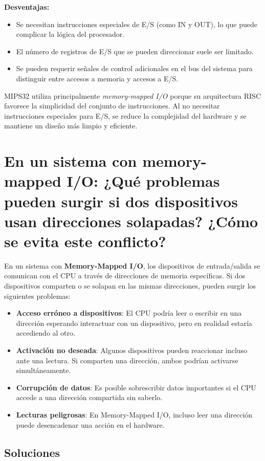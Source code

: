 \documentclass{article}
\begin{document}
\begin{itemize}
\textbf{Desventajas:}
\begin{itemize}
    \item Se necesitan instrucciones especiales de E/S (como IN y OUT), lo que puede complicar la lógica del procesador.
    \item El número de registros de E/S que se pueden direccionar suele ser limitado.
    \item Se pueden requerir señales de control adicionales en el bus del sistema para distinguir entre accesos a memoria y accesos a E/S.
\end{itemize}

    
    MIPS32 utiliza principalmente \textit{memory-mapped I/O} porque su arquitectura RISC favorece la simplicidad del conjunto de instrucciones. Al no necesitar instrucciones especiales para E/S, se reduce la complejidad del hardware y se mantiene un diseño más limpio y eficiente.

\section{En un sistema con memory-mapped I/O: ¿Qué problemas pueden surgir si dos dispositivos usan direcciones solapadas? ¿Cómo se evita este conflicto?}

En un sistema con \textbf{Memory-Mapped I/O}, los dispositivos de entrada/salida se comunican con el CPU a través de direcciones de memoria específicas. Si dos dispositivos comparten o se solapan en las mismas direcciones, pueden surgir los siguientes problemas:

\begin{itemize}[label=--]
    \item \textbf{Acceso erróneo a dispositivos}: El CPU podría leer o escribir en una dirección esperando interactuar con un dispositivo, pero en realidad estaría accediendo al otro.
    \item \textbf{Activación no deseada}: Algunos dispositivos pueden reaccionar incluso ante una lectura. Si comparten una dirección, ambos podrían activarse simultáneamente.
    \item \textbf{Corrupción de datos}: Es posible sobrescribir datos importantes si el CPU accede a una dirección compartida sin saberlo.
    \item \textbf{Lecturas peligrosas}: En Memory-Mapped I/O, incluso leer una dirección puede desencadenar una acción en el hardware.
\end{itemize}

\subsection*{Soluciones}


\end{itemize}
\end{document}
